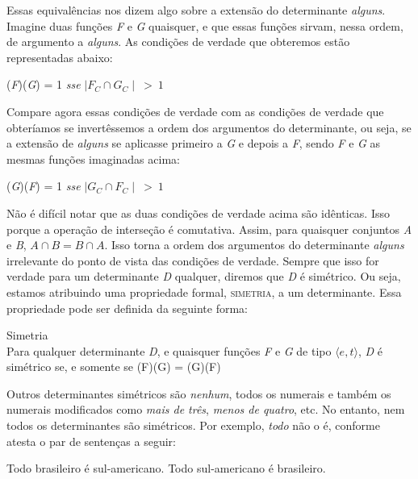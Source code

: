 \n Essas equivalências nos dizem algo sobre a extensão do
determinante \textit{alguns}. Imagine duas funções \textit{F} e
\textit{G} quaisquer, e que essas funções sirvam, nessa ordem, de
argumento a \textit{alguns}. As condições de verdade que
obteremos
estão representadas abaixo:

\begin{exe}
	\ex {}(\textit{F})(\textit{G}) = 1 \textit{sse} $\mid F_{C} \cap G_{C}\mid\ >\ 1$
\end{exe}

\n Compare agora essas condições de verdade com as condições de
verdade que obteríamos se invertêssemos a ordem dos argumentos do
determinante, ou seja, se a extensão de \textit{alguns} se
aplicasse primeiro a \textit{G} e depois a \textit{F}, sendo
\textit{F} e \textit{G} as mesmas funções imaginadas acima:

\begin{exe}
	\ex {}(\textit{G})(\textit{F}) = 1 \textit{sse} $\mid G_{C} \cap F_{C}\mid\ >\ 1$
\end{exe}

\n Não é difícil notar que as duas condições de verdade acima são
idênticas. Isso porque a operação de interseção é comutativa.
Assim, para quaisquer conjuntos \textit{A} e \textit{B}, $ A\cap B
=  B\cap A$. Isso torna a ordem dos argumentos do determinante
\textit{alguns} irrelevante do ponto de vista das condições de verdade. Sempre que isso for verdade para um
determinante \textit{D} qualquer, diremos que \textit{D} é
simétrico. Ou seja, estamos atribuindo uma propriedade formal,
\textsc{simetria}, a um determinante. Essa propriedade pode ser
definida da seguinte forma:

\begin{exe}
	\ex Simetria\\
	Para qualquer determinante \textit{D}, e quaisquer funções \textit{F} e \textit{G} de tipo $\langle e,t\rangle$, \textit{D} é simétrico se, e somente se (F)(G) = (G)(F)
\end{exe}


\n Outros determinantes simétricos são \textit{nenhum}, todos os
numerais e também os numerais modificados como \textit{mais de
três}, \textit{menos de quatro}, etc. No entanto, nem todos os
determinantes são simétricos. Por exemplo, \textit{todo} não o é,
conforme atesta o par de sentenças a seguir:


\begin{exe}
    \ex\label{tt}
    \begin{xlist}
        \ex  Todo brasileiro é sul-americano.\label{tts}
        \ex  Todo sul-americano é brasileiro.\label{ttt}
    \end{xlist}
\end{exe}


